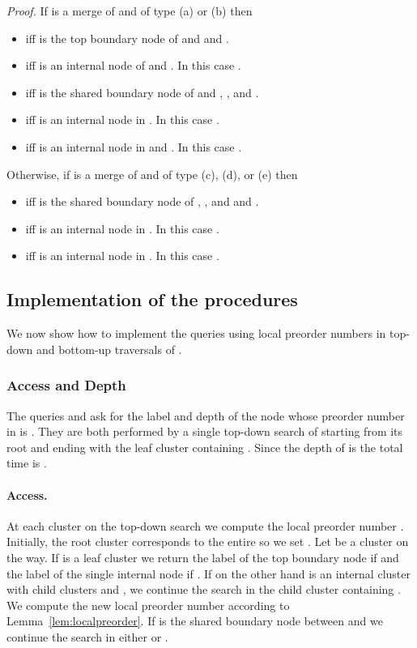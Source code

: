 \documentclass [11pt]{article}
\newenvironment{proof}{\noindent\emph{Proof. }}{}
\begin{document}
\begin{proof}
If  is a merge of  and  of type (a) or (b) then
\begin{itemize}
\item  iff  is the top boundary node of  and  and .
\item  iff  is an internal node of  and .
In this case .
\item  iff  is the shared boundary node of  and ,  , and .
\item  iff  is an internal node in . In this case .
\item  iff  is an internal node in  and . In this case .
\end{itemize}

\noindent Otherwise, if   is a merge of  and  of type (c), (d), or (e) then
\begin{itemize}
\item  iff  is the shared  boundary node of , , and  and .
\item  iff  is an internal node in . In this case .
\item  iff  is an internal node in . In this case .
\end{itemize}
\end{proof}


\subsection{Implementation of the procedures} We now show how to implement the queries using local preorder numbers in top-down and bottom-up traversals of . 



\subsubsection{Access and Depth}
The queries  and  ask for the label and depth of the node whose preorder number in  is . They are both  performed by a single top-down search of  starting from its root and ending with the leaf cluster containing . Since the depth of  is  the total time is .

\paragraph{Access.}
At each cluster  on the top-down search we compute the local preorder number . Initially, the root cluster corresponds to the entire  so we set . Let  be a cluster on the way. If  is a leaf cluster we return the label of the top boundary node if  and the label of the single internal node if . 
 If on the other hand  is an internal cluster with child clusters  and , we continue the search in the child cluster containing . We compute the new local preorder number according to Lemma~\ref{lem:localpreorder}. If   is the shared boundary node between  and  we continue the search in either  or .
\end{document}
